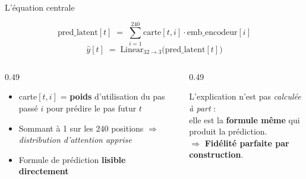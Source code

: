 \documentclass[10pt]{beamer}
\begin{document}
\begin{frame}{L'équation centrale}
  \begin{tcolorbox}[colback=newcontrib!5, colframe=newcontrib!70!black, arc=3mm,
                    fonttitle=\bfseries, title=La prédiction comme combinaison interprétable]
    \[
      \text{pred\_latent}[t] \;=\; \sum_{i=1}^{240} \text{carte}[t, i] \cdot \text{emb\_encodeur}[i]
    \]
    \[
      \hat y[t] \;=\; \text{Linear}_{32\to3}\bigl( \text{pred\_latent}[t] \bigr)
    \]
  \end{tcolorbox}

  \begin{columns}
    \begin{column}{0.49\textwidth}
      \begin{tcolorbox}[colback=blue!3, colframe=blue!50!black, arc=2mm,
                        fonttitle=\bfseries, title=Lecture sémantique]
        \begin{itemize}
          \item carte$[t, i]$ = \textbf{poids} d'utilisation du pas passé $i$ pour prédire le pas futur $t$
          \item Sommant à 1 sur les 240 positions $\Rightarrow$ \emph{distribution d'attention apprise}
          \item Formule de prédiction \textbf{lisible directement}
        \end{itemize}
      \end{tcolorbox}
    \end{column}
    \begin{column}{0.49\textwidth}
      \begin{tcolorbox}[colback=green!3, colframe=green!50!black, arc=2mm,
                        fonttitle=\bfseries, title=Pourquoi c'est intrinsèque]
        L'explication n'est pas \emph{calculée à part} :\\
        elle est la \textbf{formule même} qui produit la prédiction.\\[2pt]
        $\Rightarrow$ \textbf{Fidélité parfaite par construction}.
      \end{tcolorbox}
    \end{column}
  \end{columns}
\end{frame}
\end{document}
